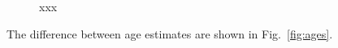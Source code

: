\documentclass[draft]{aa}
\begin{document}
  \begin{figure}
   \caption{xxx}
   \label{fig:dist_comparisions}
  \end{figure}


  The difference between age estimates are shown in Fig.~\ref{fig:ages}.
\end{document}
